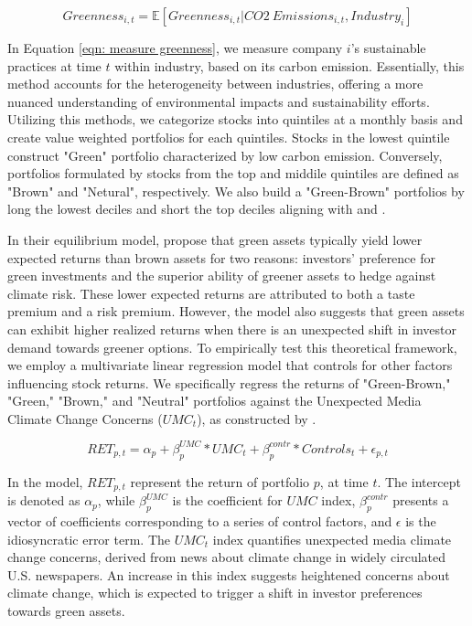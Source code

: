 \documentclass[12pt]{article}
\begin{document}
\begin{equation}
\label{eqn: measure greenness}
Greenness_{i, t} = \mathbb{E}[Greenness_{i,t} | CO2 \: Emissions_{i, t}, Industry_i]
\end{equation}

In Equation \ref{eqn: measure greenness}, we measure company $i$'s sustainable practices at time $t$ within industry, based on its carbon emission. Essentially, this method accounts for the heterogeneity between industries, offering a more nuanced understanding of environmental impacts and sustainability efforts. Utilizing this methods, we categorize stocks into quintiles at a monthly basis and create value weighted portfolios for each quintiles. Stocks in the lowest quintile construct "Green" portfolio characterized by low carbon emission. Conversely, portfolios formulated by stocks from the top and middile quintiles are defined as "Brown" and "Netural", respectively. We also build a "Green-Brown" portfolios by long the lowest deciles and short the top deciles aligning with \citet{pastor2022dissecting} and \citet{ardia2022climate}.

In their equilibrium model, \citet{pastor2021sustainable} propose that green assets typically yield lower expected returns than brown assets for two reasons: investors' preference for green investments and the superior ability of greener assets to hedge against climate risk. These lower expected returns are attributed to both a taste premium and a risk premium. However, the model also suggests that green assets can exhibit higher realized returns when there is an unexpected shift in investor demand towards greener options. To empirically test this theoretical framework, we employ a multivariate linear regression model that controls for other factors influencing stock returns. We specifically regress the returns of "Green-Brown," "Green," "Brown," and "Neutral" portfolios against the Unexpected Media Climate Change Concerns ($UMC_t$), as constructed by \citet{ardia2022climate}.

\begin{equation}
\label{eqn: regression portfolio}
RET_{p, t} = \alpha_p + \beta^{UMC}_{p}*UMC_t + \beta^{contr}_p*Controls_t + \epsilon_{p, t}
\end{equation}

\noindent In the model, $RET_{p, t}$ represent the return of portfolio $p$, at time $t$. The intercept is denoted as $\alpha_p$, while $\beta^{UMC}_p$ is the coefficient for $UMC$ index, $\beta^{contr}_p$ presents a vector of coefficients corresponding to a series of control factors, and $\epsilon$ is the idiosyncratic error term. The $UMC_t$ index quantifies unexpected media climate change concerns, derived from news about climate change in widely circulated U.S. newspapers. An increase in this index suggests heightened concerns about climate change, which is expected to trigger a shift in investor preferences towards green assets.
\end{document}
